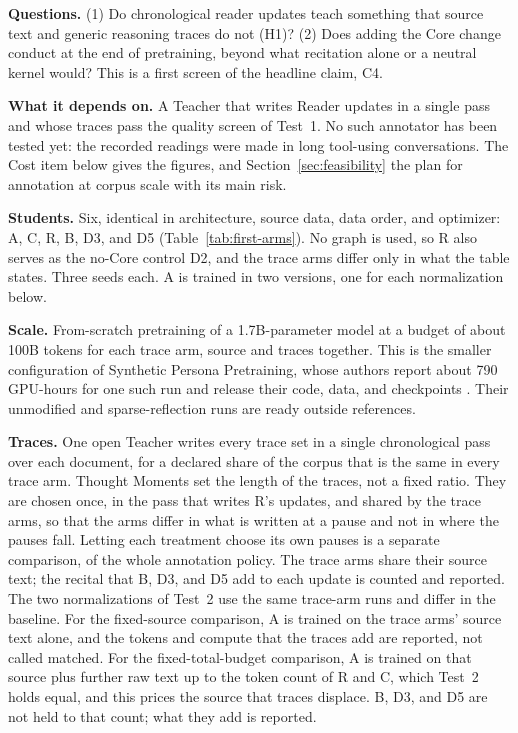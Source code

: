 \documentclass[11pt]{article}
\begin{document}
\begin{breakclaimbox}
\textbf{Questions.} (1) Do chronological reader updates teach something that
source text and generic reasoning traces do not (H1)? (2) Does adding the Core
change conduct at the end of pretraining, beyond what recitation alone or a
neutral kernel would? This is a first screen of the headline claim, C4.

\medskip
\textbf{What it depends on.} A Teacher that writes Reader updates in a single
pass and whose traces pass the quality screen of Test~1. No such annotator has
been tested yet: the recorded readings were made in long tool-using
conversations. The Cost item below gives the figures, and
Section~\ref{sec:feasibility} the plan for annotation at corpus scale with its
main risk.

\medskip
\textbf{Students.} Six, identical in architecture, source data, data order,
and optimizer: A, C, R, B, D3, and D5 (Table~\ref{tab:first-arms}). No graph
is used, so R also serves as the no-Core control D2, and the trace arms differ
only in what the table states. Three seeds each. A is trained in two versions,
one for each normalization below.

\medskip
\textbf{Scale.} From-scratch pretraining of a 1.7B-parameter model at a budget
of about 100B tokens for each trace arm, source and traces together. This is
the smaller configuration of Synthetic Persona Pretraining,
whose authors report about 790 GPU-hours for one such run and release their
code, data, and checkpoints \cite{minder2026spp}. Their unmodified and
sparse-reflection runs are ready outside references.

\medskip
\textbf{Traces.} One open Teacher writes every trace set in a single
chronological pass over each document, for a declared share of the corpus that
is the same in every trace arm. Thought Moments set the length of the traces,
not a fixed ratio. They are chosen once, in the pass that writes R's updates,
and shared by the trace arms, so that the arms differ in what is written at a
pause and not in where the pauses fall. Letting each treatment choose its own
pauses is a separate comparison, of the whole annotation policy. The trace arms
share their source text; the recital that B, D3, and D5 add to each update is
counted and reported. The two normalizations of Test~2 use the same trace-arm
runs and differ in the baseline. For the fixed-source comparison, A is trained
on the trace arms' source text alone, and the tokens and compute that the
traces add are reported, not called matched. For the fixed-total-budget
comparison, A is trained on that source plus further raw text up to the token
count of R and C, which Test~2 holds equal, and this prices the source that
traces displace. B, D3, and D5 are not held to that count; what they add is
reported.


\end{breakclaimbox}
\end{document}
